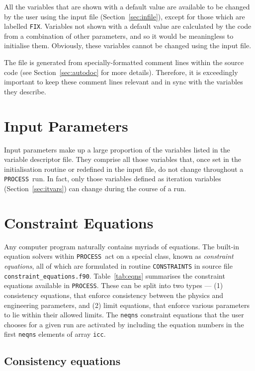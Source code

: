 \documentclass[11pt,a4paper]{report}
\newcommand{\process}{\mbox{\texttt{PROCESS}}}
\begin{document}
All the variables that are shown with a default value are available to be
changed by the user using the input file (Section~\ref{sec:infile}), except
for those which are labelled \texttt{FIX}. Variables not shown with a default
value are calculated by the code from a combination of other parameters, and
so it would be meaningless to initialise them.  Obviously, these variables
cannot be changed using the input file.

The file is generated from specially-formatted comment lines within the source
code (see Section~\ref{sec:autodoc} for more details). Therefore, it is
exceedingly important to keep these comment lines relevant and in sync with
the variables they describe.

\section{Input Parameters}
\label{sec:inpars}

Input parameters make up a large proportion of the variables listed in the
variable descriptor file. They comprise all those variables that, once set in
the initialisation routine or redefined in the input file, do not change
throughout a \process\ run. In fact, only those variables defined as iteration
variables (Section~\ref{sec:itvars}) can change during the course of a run.

\section{Constraint Equations}
\label{sec:constraints}

Any computer program naturally contains myriads of equations. The built-in
equation solvers within \process\ act on a special class, known as
\textit{constraint equations}, all of which are formulated in routine
\texttt{CONSTRAINTS} in source file
\texttt{constraint\_equations.f90}. Table~\ref{tab:eqns} summarises the
constraint equations available in \process. These can be split into two types
--- (1) consistency equations, that enforce consistency between the physics
and engineering parameters, and (2) limit equations, that enforce various
parameters to lie within their allowed limits. The \texttt{neqns} constraint
equations that the user chooses for a given run are activated by including the
equation numbers in the first \texttt{neqns} elements of array \texttt{icc}.

\subsection{Consistency equations}
\end{document}
